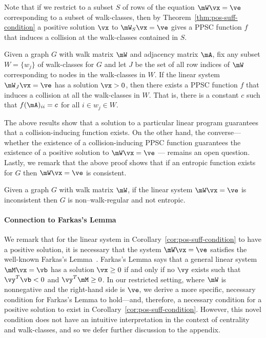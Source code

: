 Note that if we restrict to a subset $S$ of rows of the equation $\mW\vx = \ve$ corresponding to a subset of walk-classes,
then by Theorem~\ref{thm:pos-suff-condition} a positive solution $\vx$ to $\mW_S\vx = \ve$ gives a PPSC function $f$ that induces a collision at the walk-classes contained in $S$.

\begin{corollary}\label{cor:pos-suff-condition}
  Given a graph $G$ with walk matrix $\mW$ and adjacency matrix $\mA$, fix any subset $W = \{w_j\}$ of walk-classes for $G$ and let $J$ be the set of all row indices of $\mW$ corresponding to nodes in the walk-classes in $W$.
  If the linear system $\mW_J\vx = \ve$ has a solution $\vx > 0$, then there exists a PPSC function $f$ that induces a collision at all the walk-classes in $W$.
  That is, there is a constant $c$ such that $f(\mA)_{ii} = c$ for all $i \in w_j \in W$.
\end{corollary}

The above results show that a solution to a particular linear program guarantees that a collision-inducing function exists.
On the other hand, the converse---whether the existence of a collision-inducing PPSC function guarantees the existence of a positive solution to $\mW\vx=\ve$ --- remains an open question.
Lastly, we remark that the above proof shows that if an entropic function exists for $G$ then $\mW\vx = \ve$ is consistent.

\begin{corollary}\label{cor:walk-class-lin-sys}
  Given a graph $G$ with walk matrix $\mW$,
  if the linear system $\mW\vx = \ve$ is inconsistent then $G$ is non--walk-regular and not entropic.
\end{corollary}

\paragraph{Connection to Farkas's Lemma}
We remark that for the linear system in Corollary~\ref{cor:pos-suff-condition} to have a positive solution, it is necessary that the system $\mW\vx=\ve$ satisfies the well-known Farkas's Lemma~\cite{Farkas1902}.
Farkas's Lemma says that a general linear system $\mM\vx = \vb$ has a solution $\vx\geq 0$ if and only if no $\vy$ exists such that $\vy^T\vb < 0$ and $\vy^T\mM \geq0$.
In our restricted setting, where $\mW$ is nonnegative and the right-hand side is $\ve$, we derive a more specific, necessary condition for Farkas's Lemma to hold---and, therefore, a necessary condition for a positive solution to exist in Corollary~\ref{cor:pos-suff-condition}.
However, this novel condition does not have an intuitive interpretation in the context of centrality and walk-classes, and so we defer further discussion to the appendix.


